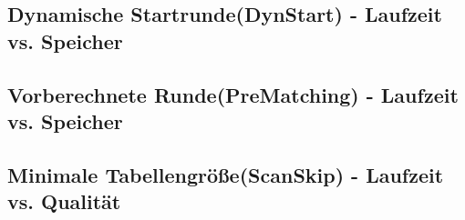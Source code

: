 \subsection{Dynamische Startrunde(DynStart) - Laufzeit vs. Speicher}


\subsection{Vorberechnete Runde(PreMatching) - Laufzeit vs. Speicher}

\subsection{Minimale Tabellengröße(ScanSkip) - Laufzeit vs. Qualität}
